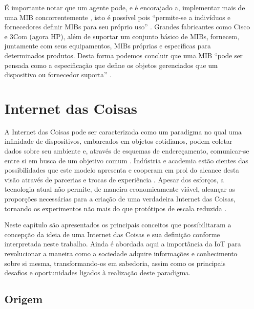\documentclass[twoside,english,brazilian]{UNISINOSmonografia}
\begin{document}
É importante notar que um agente pode, e é encorajado a, 
implementar mais de uma MIB concorrentemente 
\cite{Clemm2006}, 
isto é possível pois 
``permite-se a indivíduos e fornecedores definir MIBs para seu próprio uso'' 
\cite[p.~5]{Mauro2009}. 
Grandes fabricantes como Cisco e 3Com (agora HP), além de suportar um 
conjunto básico de MIBs, fornecem, juntamente com seus equipamentos, MIBs 
próprias e específicas para determinados produtos.
Desta forma podemos concluir que uma MIB 
``pode ser pensada como a especificação que define os objetos gerenciados que 
um dispositivo ou fornecedor suporta''
\cite[p.~27]{Mauro2009}.


\chapter{Internet das Coisas}

A Internet das Coisas pode ser caracterizada como um paradigma no qual uma 
infinidade de dispositivos, embarcados em objetos cotidianos, podem coletar 
dados sobre seu ambiente e, através de esquemas de endereçamento, comunicar-se 
entre si em busca de um objetivo comum \cite{Atzori2010b}.
Indústria e academia estão cientes das possibilidades que este modelo 
apresenta e cooperam em prol do alcance desta visão através de parcerias e 
trocas de experiência  \cite{ITU2005}.
Apesar dos esforços, a tecnologia atual não permite, de maneira economicamente 
viável, alcançar as proporções necessárias para a criação de uma verdadeira 
Internet das Coisas, tornando os experimentos não mais do que protótipos de 
escala reduzida \cite{Smith2012}.


Neste capítulo são apresentados os principais conceitos que possibilitaram a 
concepção da ideia de uma Internet das Coisas e sua definição conforme 
interpretada neste trabalho.
Ainda é abordada aqui a importância da IoT para revolucionar a maneira como a 
sociedade adquire informações e conhecimento sobre si mesma, transformando-os 
em sabedoria, assim como os principais desafios e oportunidades ligados à 
realização deste paradigma.


\section{Origem}
\end{document}
